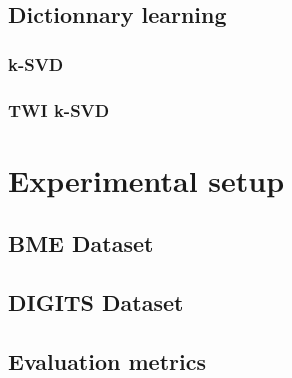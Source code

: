 \documentclass[10pt,twocolumn,letterpaper]{article}
\begin{document}
\subsection{Dictionnary learning}

\subsubsection{k-SVD}

\paragraph{} 

\subsubsection{TWI k-SVD}

\paragraph{} 


\section{Experimental setup}
\label{sec:setup}

\subsection{BME Dataset}

\paragraph{} 

\subsection{DIGITS Dataset}

\paragraph{} 

\subsection{Evaluation metrics}

\paragraph{} 
\end{document}
